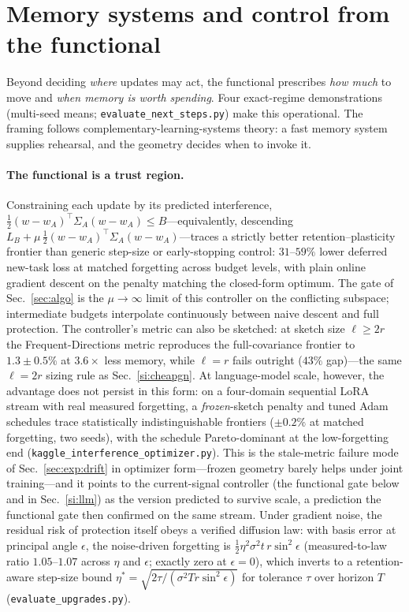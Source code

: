 \documentclass[10pt,a4paper]{article}
\theoremstyle{plain}
\theoremstyle{definition}
\newcommand{\Sig}{\Sigma}
\begin{document}
\section{Memory systems and control from the functional}
\label{si:memory}
Beyond deciding \emph{where} updates may act, the functional prescribes \emph{how much} to
move and \emph{when memory is worth spending}. Four exact-regime demonstrations (multi-seed
means; \texttt{evaluate\_next\_steps.py}) make this operational. The framing follows
complementary-learning-systems theory: a fast memory system supplies rehearsal, and the
geometry decides when to invoke it.

\paragraph{The functional is a trust region.} Constraining each update by its predicted
interference, $\tfrac12(w-w_A)^\top\Sig_A(w-w_A)\le B$---equivalently, descending
$L_B+\mu\,\tfrac12(w-w_A)^\top\Sig_A(w-w_A)$---traces a strictly better
retention--plasticity frontier than generic step-size or early-stopping control:
$31$--$59\%$ lower deferred new-task loss at matched forgetting across budget levels, with
plain online gradient descent on the penalty matching the closed-form optimum. The gate of
Sec.~\ref{sec:algo} is the $\mu\to\infty$ limit of this controller on the conflicting
subspace; intermediate budgets interpolate continuously between naive descent and full
protection. The controller's metric can also be sketched: at sketch size $\ell\ge2r$ the
Frequent-Directions metric reproduces the full-covariance frontier to $1.3\pm0.5\%$ at
$3.6\times$ less memory, while $\ell=r$ fails outright ($43\%$ gap)---the same $\ell=2r$
sizing rule as Sec.~\ref{si:cheapgn}. At language-model scale, however, the advantage does
not persist in this form: on a four-domain sequential LoRA stream with real measured
forgetting, a \emph{frozen}-sketch penalty and tuned Adam schedules trace statistically
indistinguishable frontiers ($\pm0.2\%$ at matched forgetting, two seeds), with the
schedule Pareto-dominant at the low-forgetting end
(\texttt{kaggle\_interference\_optimizer.py}). This is the stale-metric failure mode of
Sec.~\ref{sec:exp:drift} in optimizer form---frozen geometry barely helps under joint
training---and it points to the current-signal controller (the functional gate below and
in Sec.~\ref{si:llm}) as the version predicted to survive scale, a prediction the
functional gate then confirmed on the same stream. Under gradient noise, the
residual risk of protection
itself obeys a verified diffusion law: with basis error at principal angle $\epsilon$, the
noise-driven forgetting is $\tfrac12\eta^2\sigma^2 t\,r\sin^2\epsilon$ (measured-to-law
ratio $1.05$--$1.07$ across $\eta$ and $\epsilon$; exactly zero at $\epsilon=0$), which
inverts to a retention-aware step-size bound
$\eta^\ast=\sqrt{2\tau/(\sigma^2 T r\sin^2\epsilon)}$ for tolerance $\tau$ over horizon
$T$ (\texttt{evaluate\_upgrades.py}).
\end{document}
